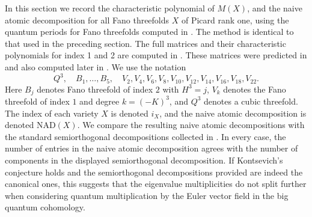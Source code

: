 \documentclass[11pt]{amsart}
\theoremstyle{plain}
\numberwithin{equation}{section}
\theoremstyle{definition}
\theoremstyle{remark}
\begin{document}
In this section we record the characteristic polynomial of $M(X)$, and the naive atomic decomposition for all Fano threefolds $X$ of Picard rank one, using the quantum periods for Fano threefolds computed in \cite{CCGK16}. The method is identical to that used in the preceding section. The full matrices and their characteristic polynomials for index 1 and 2 are computed in \cite{BvBS26}. These matrices were predicted in \cite{Gol07} and also computed later in \cite{Pr06} \cite{Pr07a} \cite{Pr07b}.
We use the notation
\[
  Q^3,\quad B_1,\ldots,B_5,\quad
  V_2,V_4,V_6,V_8,V_{10},V_{12},V_{14},V_{16},V_{18},V_{22}.
\]
Here $B_j$ denotes Fano threefold of index $2$ with
$H^3=j$, $V_k$ denotes the
Fano threefold of index $1$ and degree $k=(-K)^3$, and $Q^3$ denotes a cubic threefold. The index of each variety $X$ is denoted $i_X$, and the naive atomic decomposition is denoted $\mathrm{NAD}(X)$. We compare the resulting naive atomic decompositions with the standard
semiorthogonal decompositions collected in \cite{PS23}. In every case, the number of entries in the naive atomic decomposition agrees with the number of components in the displayed semiorthogonal decomposition. If Kontsevich's conjecture holds and the semiorthogonal decompositions provided are indeed the canonical ones, this suggests that the eigenvalue multiplicities do not split further when considering quantum multiplication by the Euler vector field in the big quantum cohomology.
\end{document}
